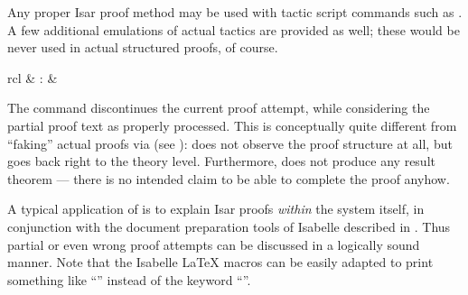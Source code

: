 \begin{isabellebody}
\begin{isamarkuptext}
\begin{descr}
  \end{descr}

  Any proper Isar proof method may be used with tactic script commands
  such as \mbox{}.  A few additional emulations of actual
  tactics are provided as well; these would be never used in actual
  structured proofs, of course.%
\end{isamarkuptext}%
\isamarkuptrue%
%
\isamarkuptrue%
%
\begin{isamarkuptext}%
\begin{matharray}{rcl}
    \mbox{} & : &  \\
  \end{matharray}

  The \mbox{} command discontinues the current proof
  attempt, while considering the partial proof text as properly
  processed.  This is conceptually quite different from ``faking''
  actual proofs via \mbox{} (see
  ): \mbox{} does not observe the
  proof structure at all, but goes back right to the theory level.
  Furthermore, \mbox{} does not produce any result theorem
  --- there is no intended claim to be able to complete the proof
  anyhow.

  A typical application of \mbox{} is to explain Isar proofs
  \emph{within} the system itself, in conjunction with the document
  preparation tools of Isabelle described in \cite{isabelle-sys}.
  Thus partial or even wrong proof attempts can be discussed in a
  logically sound manner.  Note that the Isabelle {\LaTeX} macros can
  be easily adapted to print something like ``\isa{{\isasymdots}}'' instead of
  the keyword ``\mbox{}''.


\end{isamarkuptext}
\end{isabellebody}
